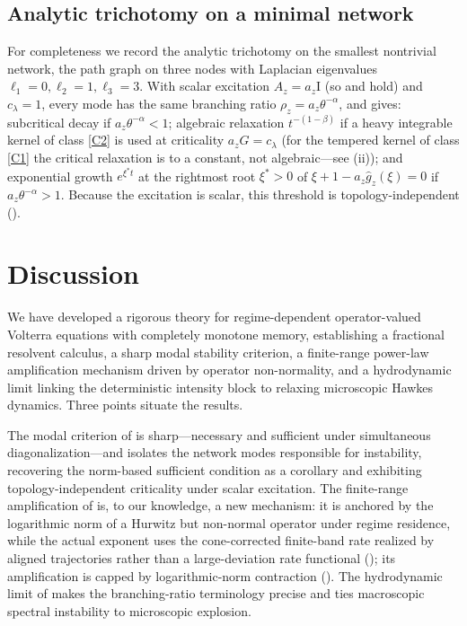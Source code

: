 \documentclass[11pt]{article}
\theoremstyle{plain}
\theoremstyle{definition}
\theoremstyle{remark}
\newcommand{\Laplace}{\widehat}
\newcommand{\branch}{\rho}
\newcommand{\id}{\mathrm{I}}
\begin{document}
\subsection{Analytic trichotomy on a minimal network}

For completeness we record the analytic trichotomy on the smallest nontrivial network, the path
graph on three nodes with Laplacian eigenvalues $\ell_1=0,\ell_2=1,\ell_3=3$. With scalar
excitation $A_z=a_z\id$ (so  and  hold) and $c_\lambda=1$, every
mode has the same branching ratio $\branch_z=a_z\theta^{-\alpha}$, and  gives:
subcritical decay if $a_z\theta^{-\alpha}<1$; algebraic relaxation $t^{-(1-\beta)}$ if a heavy
integrable kernel of class \ref{C2} is used at criticality $a_zG=c_\lambda$ (for the tempered
kernel of class \ref{C1} the critical relaxation is to a constant, not algebraic---see
(ii)); and exponential
growth $e^{\xi^\ast t}$ at the rightmost root $\xi^\ast>0$ of $\xi+1-a_z\Laplace g_z(\xi)=0$ if
$a_z\theta^{-\alpha}>1$. Because the excitation is scalar, this threshold is topology-independent
().

\section{Discussion}
\label{sec:discussion}

We have developed a rigorous theory for regime-dependent operator-valued Volterra equations with
completely monotone memory, establishing a fractional resolvent calculus, a sharp modal stability
criterion, a finite-range power-law amplification mechanism driven by operator non-normality, and a hydrodynamic
limit linking the deterministic intensity block to relaxing microscopic Hawkes dynamics. Three points situate the
results.

The modal criterion of  is sharp---necessary and sufficient under simultaneous
diagonalization---and isolates the network modes responsible for instability, recovering the
norm-based sufficient condition as a corollary and exhibiting topology-independent criticality
under scalar excitation. The finite-range amplification of  is, to our
knowledge, a new mechanism: it is anchored by the logarithmic norm of a Hurwitz but non-normal
operator under regime residence, while the actual exponent uses the cone-corrected finite-band
rate realized by aligned trajectories rather than a large-deviation rate functional
(); its amplification is capped by logarithmic-norm contraction
(). The hydrodynamic limit of
 makes the branching-ratio terminology precise and ties macroscopic spectral
instability to microscopic explosion.
\end{document}
